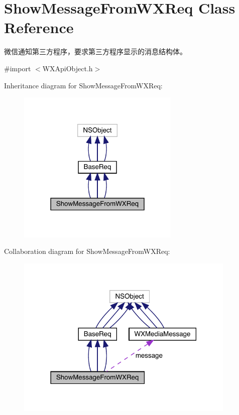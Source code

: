 \hypertarget{interface_show_message_from_w_x_req}{}\section{Show\+Message\+From\+W\+X\+Req Class Reference}
\label{interface_show_message_from_w_x_req}


微信通知第三方程序，要求第三方程序显示的消息结构体。  




{\ttfamily \#import $<$W\+X\+Api\+Object.\+h$>$}



Inheritance diagram for Show\+Message\+From\+W\+X\+Req\+:\nopagebreak
\begin{figure}[H]
\begin{center}
\leavevmode
\includegraphics[width=219pt]{interface_show_message_from_w_x_req__inherit__graph}
\end{center}
\end{figure}


Collaboration diagram for Show\+Message\+From\+W\+X\+Req\+:\nopagebreak
\begin{figure}[H]
\begin{center}
\leavevmode
\includegraphics[width=297pt]{interface_show_message_from_w_x_req__coll__graph}
\end{center}
\end{figure}
